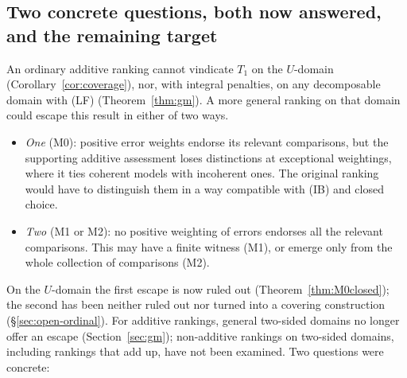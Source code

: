 \documentclass[11pt]{article}
\theoremstyle{definition}
\theoremstyle{remark}
\begin{document}
\subsection{Two concrete questions, both now answered, and the remaining target}\label{sec:two-questions}
An ordinary additive ranking cannot vindicate $T_1$ on the $U$-domain (Corollary~\ref{cor:coverage}), nor, with integral penalties, on any decomposable domain with (LF) (Theorem~\ref{thm:gm}). A more general ranking on that domain could escape this result in either of two ways.
\begin{itemize}[leftmargin=*]
\item \emph{One} (M0): positive error weights endorse its relevant comparisons, but the supporting additive assessment loses distinctions at exceptional weightings, where it ties coherent models with incoherent ones. The original ranking would have to distinguish them in a way compatible with (IB) and closed choice.
\item \emph{Two} (M1 or M2): no positive weighting of errors endorses all the relevant comparisons. This may have a finite witness (M1), or emerge only from the whole collection of comparisons (M2).
\end{itemize}
On the $U$-domain the first escape is now ruled out (Theorem~\ref{thm:M0closed}); the second has been neither ruled out nor turned into a covering construction (\S\ref{sec:open-ordinal}). For additive rankings, general two-sided domains no longer offer an escape (Section~\ref{sec:gm}); non-additive rankings on two-sided domains, including rankings that add up, have not been examined. Two questions were concrete:
\end{document}
